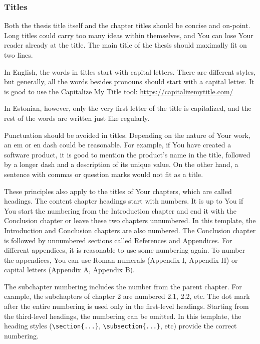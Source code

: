 \subsubsection{Titles}
Both the thesis title itself and the chapter titles should be concise and on-point. Long titles could carry too many ideas within themselves, and You can lose Your reader already at the title. The main title of the thesis should maximally fit on two lines.

In English, the words in titles start with capital letters. There are different styles, but generally, all the words besides pronouns should start with a capital letter. It is good to use the Capitalize My Title tool: \url{https://capitalizemytitle.com/}

In Estonian, however, only the very first letter of the title is capitalized, and the rest of the words are written just like regularly.

Punctuation should be avoided in titles. Depending on the nature of Your work, an em or en dash could be reasonable. For example, if You have created a software product, it is good to mention the product's name in the title, followed by a longer dash and a description of its unique value. On the other hand, a sentence with commas or question marks would not fit as a title.

These principles also apply to the titles of Your chapters, which are called headings. The content chapter headings start with numbers. It is up to You if You start the numbering from the Introduction chapter and end it with the Conclusion chapter or leave these two chapters unnumbered. In this template, the Introduction and Conclusion chapters are also numbered. The Conclusion chapter is followed by unnumbered sections called References and Appendices. For different appendices, it is reasonable to use some numbering again. To number the appendices, You can use Roman numerals (Appendix I, Appendix II) or capital letters (Appendix A, Appendix B).

The subchapter numbering includes the number from the parent chapter. For example, the subchapters of chapter 2 are numbered 2.1, 2.2, etc. The dot mark after the entire numbering is used only in the first-level headings. Starting from the third-level headings, the numbering can be omitted. In this template, the heading styles (\verb|\section{...}|, \verb|\subsection{...}|, etc) provide the correct numbering.

